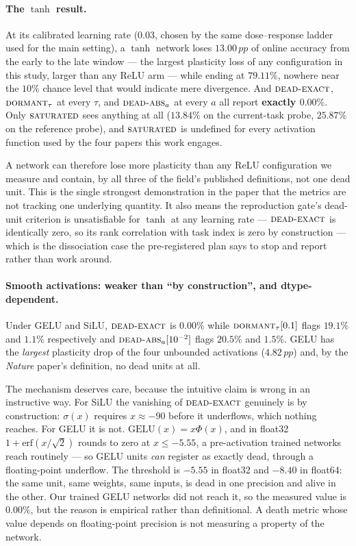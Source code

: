 \documentclass[10pt]{article}
\newcommand{\dexact}{\textsc{dead-exact}}
\newcommand{\ddorm}{\textsc{dormant}_\tau}
\newcommand{\dabs}{\textsc{dead-abs}_a}
\newcommand{\dsat}{\textsc{saturated}}
\newcommand{\pp}{\,pp}
\begin{document}
\paragraph{The $\tanh$ result.}
At its calibrated learning rate ($0.03$, chosen by the same dose--response ladder
used for the main setting), a $\tanh$ network loses $13.00\pp$ of online accuracy
from the early to the late window --- the largest plasticity loss of any
configuration in this study, larger than any ReLU arm --- while ending at
$79.11\%$, nowhere near the $10\%$ chance level that would indicate mere
divergence. And $\dexact$, $\ddorm$ at every $\tau$, and $\dabs$ at every $a$
all report \textbf{exactly $0.00\%$}. Only $\dsat$ sees anything at all
($13.84\%$ on the current-task probe, $25.87\%$ on the reference probe), and
$\dsat$ is undefined for every activation function used by the four papers this
work engages.

A network can therefore lose more plasticity than any ReLU configuration we
measure and contain, by all three of the field's published definitions, not one
dead unit. This is the single strongest demonstration in the paper that the
metrics are not tracking one underlying quantity. It also means the reproduction
gate's dead-unit criterion is unsatisfiable for $\tanh$ at any learning rate ---
$\dexact$ is identically zero, so its rank correlation with task index is zero by
construction --- which is the dissociation case the pre-registered plan says to
stop and report rather than work around.

\paragraph{Smooth activations: weaker than ``by construction'', and
dtype-dependent.}
Under GELU and SiLU, $\dexact$ is $0.00\%$ while $\ddorm[0.1]$ flags $19.1\%$ and
$1.1\%$ respectively and $\dabs[10^{-2}]$ flags $20.5\%$ and $1.5\%$. GELU has
the \emph{largest} plasticity drop of the four unbounded activations
($4.82\pp$) and, by the \emph{Nature} paper's definition, no dead units at all.

The mechanism deserves care, because the intuitive claim is wrong in an
instructive way. For SiLU the vanishing of $\dexact$ genuinely is by
construction: $\sigma(x)$ requires $x \approx -90$ before it underflows, which
nothing reaches. For GELU it is not. $\mathrm{GELU}(x) = x\Phi(x)$, and in
float32 $1 + \mathrm{erf}(x/\sqrt{2})$ rounds to zero at $x \le -5.55$, a
pre-activation trained networks reach routinely --- so GELU units \emph{can}
register as exactly dead, through a floating-point underflow. The threshold is
$-5.55$ in float32 and $-8.40$ in float64: the same unit, same weights, same
inputs, is dead in one precision and alive in the other. Our trained GELU
networks did not reach it, so the measured value is $0.00\%$, but the reason is
empirical rather than definitional. A death metric whose value depends on
floating-point precision is not measuring a property of the network.
\end{document}
